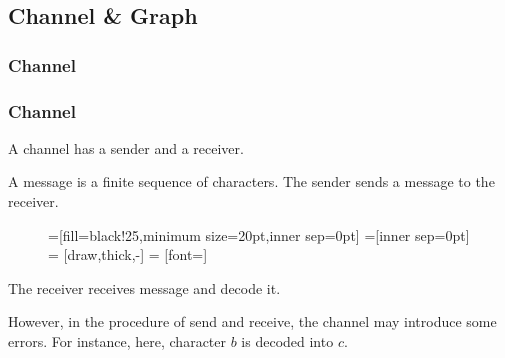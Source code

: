 \subsection{\texorpdfstring{Channel \& Graph}{Channel and Graph}}

\subsubsection*{Channel}

      \begin{frame}
            \frametitle{Channel}
            \begin{definition}[channel]
                  A channel has a sender and a receiver.
                  \pause


                  A message is a finite sequence of characters.
                  The sender sends a message to the receiver.
                  \begin{figure}[h!]
                        =[fill=black!25,minimum size=20pt,inner sep=0pt]
                        =[inner sep=0pt]
                         = [draw,thick,-]
                         = [font=\small]
                  \end{figure}
                  \pause
                  
                  The receiver receives message and decode it.
                  \pause

                  However, in the procedure of send and receive, the channel may introduce some errors. For instance, here, character $b$ is decoded into $c$. 
            \end{definition}
      \end{frame}

